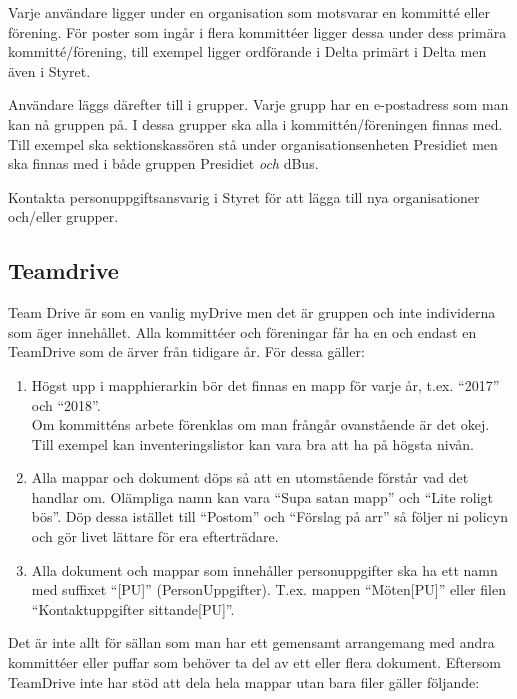 Varje användare ligger under en organisation som motsvarar en kommitté eller förening. För poster som ingår i flera kommittéer ligger dessa under dess primära kommitté/förening, till exempel ligger ordförande i Delta primärt i Delta men även i Styret.

Användare läggs därefter till i grupper. Varje grupp har en e-postadress som man kan nå gruppen på. I dessa grupper ska alla i kommittén/föreningen finnas med. Till exempel ska sektionskassören stå under organisationsenheten Presidiet men ska finnas med i både gruppen Presidiet \textit{och} dBus.

Kontakta personuppgiftsansvarig i Styret för att lägga till nya organisationer och/eller grupper.

\subsection{Teamdrive}

Team Drive är som en vanlig myDrive men det är gruppen och inte individerna som äger innehållet. Alla kommittéer och föreningar får ha en och endast en TeamDrive som de ärver från tidigare år. För dessa gäller:

\begin{enumerate}
    \item Högst upp i mapphierarkin bör det finnas en mapp för varje år, t.ex. ``2017'' och ``2018''.\\
    Om kommitténs arbete förenklas om man frångår ovanstående är det okej. Till exempel kan inventeringslistor kan vara bra att ha på högsta nivån.
    \item Alla mappar och dokument döps så att en utomstående förstår vad det handlar om. Olämpliga namn kan vara ``Supa satan mapp'' och ``Lite roligt bös''. Döp dessa istället till ``Postom'' och ``Förslag på arr'' så följer ni policyn och gör livet lättare för era efterträdare.
    \item Alla dokument och mappar som innehåller personuppgifter ska ha ett namn med suffixet ``[PU]'' (PersonUppgifter). T.ex. mappen ``Möten[PU]'' eller filen ``Kontaktuppgifter sittande[PU]''.
\end{enumerate}


Det är inte allt för sällan som man har ett gemensamt arrangemang med andra kommittéer eller puffar som behöver ta del av ett eller flera dokument. Eftersom TeamDrive inte har stöd att dela hela mappar utan bara filer gäller följande:

